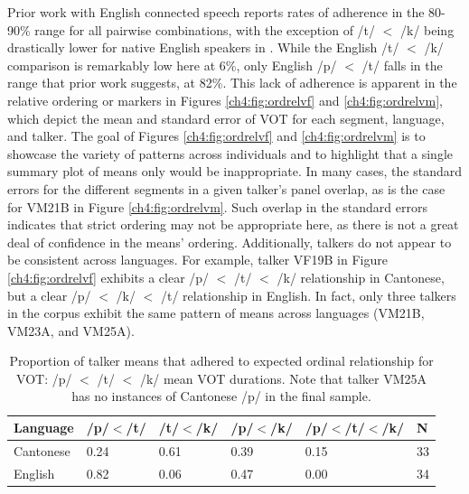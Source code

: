 Prior work with English connected speech reports rates of adherence in the 80-90\% range for all pairwise combinations, with the exception of /t/ $<$ /k/ being drastically lower for native English speakers in \citet{chodroff_2019_l2}. While the English /t/ $<$ /k/ comparison is remarkably low here at 6\%, only English /p/ $<$ /t/ falls in the range that prior work suggests, at 82\%. This lack of adherence is apparent in the relative ordering or markers in Figures \ref{ch4:fig:ordrelvf} and \ref{ch4:fig:ordrelvm}, which depict the mean and standard error of VOT for each segment, language, and talker. The goal of Figures \ref{ch4:fig:ordrelvf} and \ref{ch4:fig:ordrelvm} is to showcase the variety of patterns across individuals and to highlight that a single summary plot of means only would be inappropriate. In many cases, the standard errors for the different segments in a given talker's panel overlap, as is the case for VM21B in Figure \ref{ch4:fig:ordrelvm}. Such overlap in the standard errors indicates that strict ordering may not be appropriate here, as there is not a great deal of confidence in the means' ordering. Additionally, talkers do not appear to be consistent across languages. For example, talker VF19B in Figure \ref{ch4:fig:ordrelvf} exhibits a clear /p/ $<$ /t/ $<$ /k/ relationship in Cantonese, but a clear /p/ $<$ /k/ $<$ /t/ relationship in English. In fact, only three talkers in the corpus exhibit the same pattern of means across languages (VM21B, VM23A, and VM25A).

\begin{table}[hb!]
\caption{Proportion of talker means that adhered to expected ordinal relationship for VOT: /p/ $<$ /t/ $<$ /k/ mean VOT durations. Note that talker VM25A has no instances of Cantonese /p/ in the final sample.}
  \label{tab:ordrel}
  \centering
  \begin{tabular}{llllll}
    \toprule
    \textbf{Language} & \textbf{/p/$<$/t/} & \textbf{/t/$<$/k/} & \textbf{/p/$<$/k/} & \textbf{/p/$<$/t/$<$/k/} &  \textbf{N} \\
    \midrule 
    Cantonese   & 0.24  & 0.61  & 0.39  &  0.15 & 33 \\
    English     & 0.82  & 0.06  & 0.47  &  0.00  & 34 \\
    \bottomrule
  \end{tabular}
\end{table}


